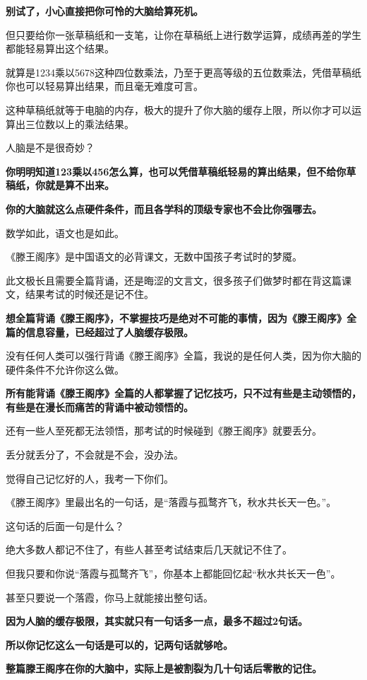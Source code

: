 \documentclass[UTF8, 11pt, oneside]{ctexart}
\newcommand{\zd}[1]{\textbf{\textcolor[RGB]{123,12,0}{#1}}} %
\begin{document}
\zd{别试了，小心直接把你可怜的大脑给算死机。}

但只要给你一张草稿纸和一支笔，让你在草稿纸上进行数学运算，成绩再差的学生都能轻易算出这个结果。

就算是1234乘以5678这种四位数乘法，乃至于更高等级的五位数乘法，凭借草稿纸你也可以轻易算出结果，而且毫无难度可言。

这种草稿纸就等于电脑的内存，极大的提升了你大脑的缓存上限，所以你才可以运算出三位数以上的乘法结果。

人脑是不是很奇妙？

\zd{你明明知道123乘以456怎么算，也可以凭借草稿纸轻易的算出结果，但不给你草稿纸，你就是算不出来。}

\zd{你的大脑就这么点硬件条件，而且各学科的顶级专家也不会比你强哪去。}

数学如此，语文也是如此。

《滕王阁序》是中国语文的必背课文，无数中国孩子考试时的梦魇。

此文极长且需要全篇背诵，还是晦涩的文言文，很多孩子们做梦时都在背这篇课文，结果考试的时候还是记不住。

\zd{想全篇背诵《滕王阁序》，不掌握技巧是绝对不可能的事情，因为《滕王阁序》全篇的信息容量，已经超过了人脑缓存极限。}

没有任何人类可以强行背诵《滕王阁序》全篇，我说的是任何人类，因为你大脑的硬件条件不允许你这么做。

\zd{所有能背诵《滕王阁序》全篇的人都掌握了记忆技巧，只不过有些是主动领悟的，有些是在漫长而痛苦的背诵中被动领悟的。}

还有一些人至死都无法领悟，那考试的时候碰到《滕王阁序》就要丢分。

丢分就丢分了，不会就是不会，没办法。

觉得自己记忆好的人，我考一下你们。

《滕王阁序》里最出名的一句话，是“落霞与孤鹜齐飞，秋水共长天一色。”。

这句话的后面一句是什么？

绝大多数人都记不住了，有些人甚至考试结束后几天就记不住了。

但我只要和你说“落霞与孤鹜齐飞”，你基本上都能回忆起“秋水共长天一色”。

甚至只要说一个落霞，你马上就能接出整句话。

\zd{因为人脑的缓存极限，其实就只有一句话多一点，最多不超过2句话。}

\zd{所以你记忆这么一句话是可以的，记两句话就够呛。}

\zd{整篇滕王阁序在你的大脑中，实际上是被割裂为几十句话后零散的记住。}
\end{document}
